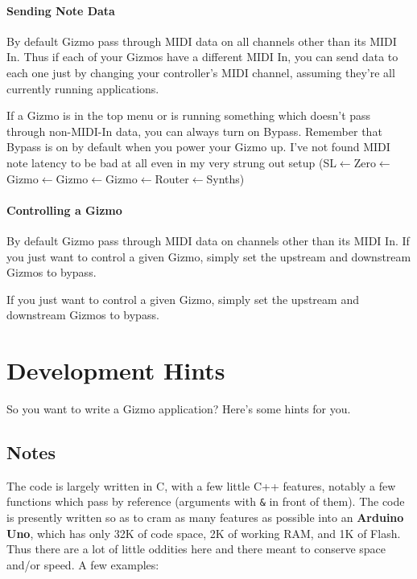 \documentclass{article}
\begin{document}
\paragraph{Sending Note Data} By default Gizmo pass through MIDI data on all channels other than its MIDI In.  Thus if each of your Gizmos have a different MIDI In, you can send data to each one just by changing your controller's MIDI channel, assuming they're all currently running applications.

If a Gizmo is in the top menu or is running something which doesn't pass through non-MIDI-In data, you can always turn on Bypass.  Remember that Bypass is on by default when you power your Gizmo up.  I've not found MIDI note latency to be bad at all even in my very strung out setup (SL\(\leftarrow\)Zero\(\leftarrow\)Gizmo\(\leftarrow\)Gizmo\(\leftarrow\)Gizmo\(\leftarrow\)Router\(\leftarrow\)Synths)

\paragraph{Controlling a Gizmo} By default Gizmo pass through MIDI data on channels other than its MIDI In.  If you just want to control a given Gizmo, simply set the upstream and downstream Gizmos to bypass.  


If you just want to control a given Gizmo, simply set the upstream and downstream Gizmos to bypass.  



\section{Development Hints}

So you want to write a Gizmo application?  Here's some hints for you.

\subsection{Notes}

The code is largely written in C, with a few little C++ features, notably
a few functions which pass by reference (arguments with \texttt{\&} in front of them).  The
code is presently written so as to cram as many features as possible into an
{\bf Arduino Uno}, which has only 32K of code space, 2K of working RAM, and 1K of Flash.  
Thus there are a lot of little oddities here and there meant to conserve space and/or
speed.  A few examples:
\end{document}

